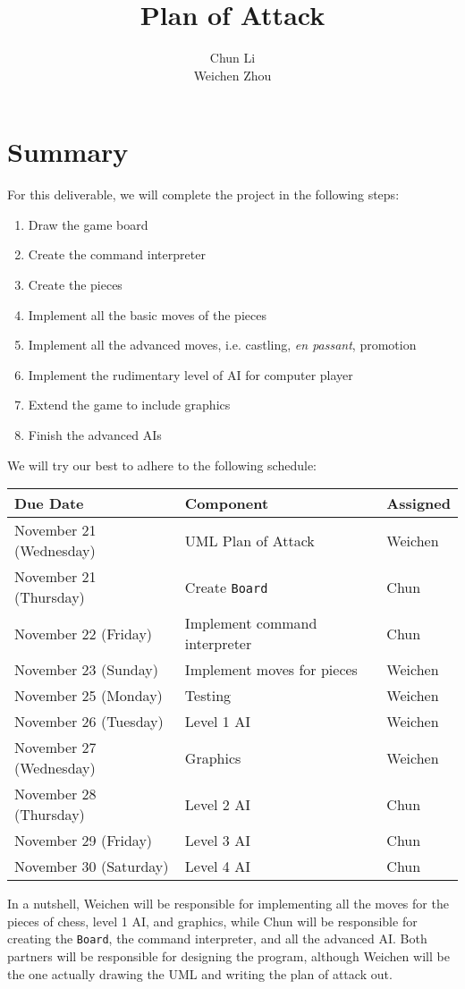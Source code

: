 \documentclass[12pt]{report}
\begin{document}
\title{Plan of Attack}
\author{Chun Li \\ Weichen Zhou}
\maketitle
\section*{Summary}
For this deliverable, we will complete the project in the following steps: \begin{enumerate}
\item Draw the game board 
\item Create the command interpreter
\item Create the pieces 
\item Implement all the basic moves of the pieces
\item Implement all the advanced moves, i.e. castling, \textit{en passant}, promotion
\item Implement the rudimentary level of AI for computer player
\item Extend the game to include graphics
\item Finish the advanced AIs
\end{enumerate}
We will try our best to adhere to the following schedule: 
\begin{center}
\begin{tabular}{p{2.5in}|p{2.5in}|p{1in}}
\textbf{Due Date} & \textbf{Component} & \textbf{Assigned} \\ \hline
November 21 (Wednesday) & UML \newline Plan of Attack & Weichen \\ \hline
November 21 (Thursday) & Create \texttt{Board} & Chun \\ \hline
November 22 (Friday) & Implement command interpreter & Chun \\ \hline
November 23 (Sunday) & Implement moves for pieces & Weichen \\ \hline
November 25 (Monday) & Testing & Weichen \\ \hline
November 26 (Tuesday) & Level 1 AI & Weichen \\ \hline
November 27 (Wednesday) & Graphics & Weichen \\ \hline
November 28 (Thursday) & Level 2 AI & Chun \\ \hline
November 29 (Friday) & Level 3 AI & Chun \\ \hline
November 30 (Saturday) & Level 4 AI & Chun 
\end{tabular}
\end{center}
In a nutshell, Weichen will be responsible for implementing all the moves for the pieces of chess, level 1 AI, and graphics, while Chun will be responsible for creating the \texttt{Board}, the command interpreter, and all the advanced AI. Both partners will be responsible for designing the program, although Weichen will be the one actually drawing the UML and writing the plan of attack out. 
\end{document}
